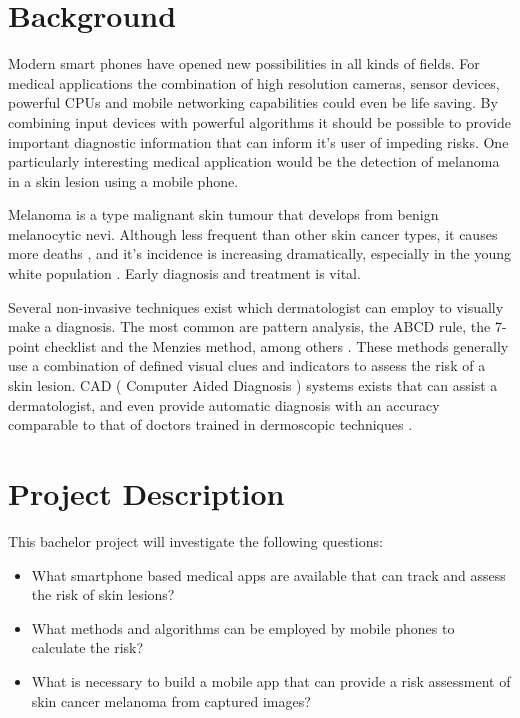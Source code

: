 \section{Background}

Modern smart phones have opened new possibilities in all kinds of fields. For medical applications the combination of high resolution cameras, sensor devices, powerful CPUs and mobile networking capabilities could even be life saving. By combining input devices with powerful algorithms it should be possible to provide important diagnostic information that can inform it’s user of impeding risks. One particularly interesting medical application would be the detection of melanoma in a skin lesion using a mobile phone.

Melanoma is a type malignant skin tumour that develops from benign melanocytic nevi. Although less frequent than other skin cancer types, it causes more deaths \cite{cancer_gov_skin}, and it’s incidence is increasing dramatically, especially in the young white population \cite{S_ez_2013}. Early diagnosis and treatment is vital.

Several non-invasive techniques exist which dermatologist can employ to visually make a diagnosis. The most common are pattern analysis, the ABCD rule, the 7-point checklist and the Menzies method, among others \cite{marghoob2004atlas}. These methods generally use a combination of defined visual clues and indicators to assess the risk of a skin lesion. CAD ( Computer Aided Diagnosis ) systems exists that can assist a dermatologist, and even provide automatic diagnosis with an accuracy comparable to that of doctors trained in dermoscopic techniques \cite{Filho2015}.


\section{Project Description}

This bachelor project will investigate the following questions:

\noindent
\begin{itemize}
\item What smartphone based medical apps are available that can track and assess the risk of skin lesions?
\item What methods and algorithms can be employed by mobile phones to calculate the risk?
\item What is necessary to build a mobile app that can provide a risk assessment of skin cancer melanoma from captured images?

\end{itemize}

